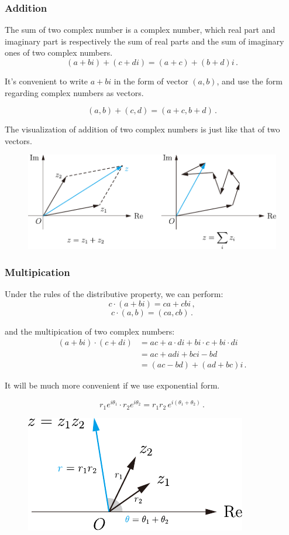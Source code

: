 \documentclass[UTF8]{ctexart}
\begin{document}
\subsubsection{Addition}
The sum of two complex number is a complex number, which real part and imaginary part is respectively the sum of real parts and the sum of imaginary ones of two complex numbers.
\[ (a + b i) + (c + d i) = (a + c) + (b + d) i  \,.\]

It's convenient to write $ a + b i $ in the form of vector $ (a, b) $, and use the form regarding complex numbers as vectors. 

\[ (a, b) + (c, d) = (a + c, b + d) \,.\]

The visualization of addition of two complex numbers is just like that of two vectors.

\begin{figure}[H]
    \centering
    \includegraphics[width = 0.8\linewidth]{./pic/addition.pdf}
\end{figure}



\subsubsection{Multipication}
Under the rules of the distributive property, we can perform:
\[ c \cdot (a + b i) = ca + cb i \,,\]
\[ c \cdot (a, b) = (ca, cb) \,.\]

and the multipication of two complex numbers:
\begin{align*}
    (a + b i) \cdot (c + d i) &= a c + a \cdot d i + b i \cdot c + b i \cdot d i \\
    &= ac + ad i + bc i - bd \\
    &= (ac - bd) + (ad + bc) i \,.
\end{align*}

It will be much more convenient if we use exponential form.

\[ r_1 e^{i \theta_1} \cdot r_2 e^{i \theta_2} = r_1 r_2\, e^{i (\theta_1 + \theta_2)} \,.\]

\begin{figure}[H]
    \centering
    \includegraphics[width = 0.5\linewidth]{./pic/multi.pdf}
\end{figure}
\end{document}
